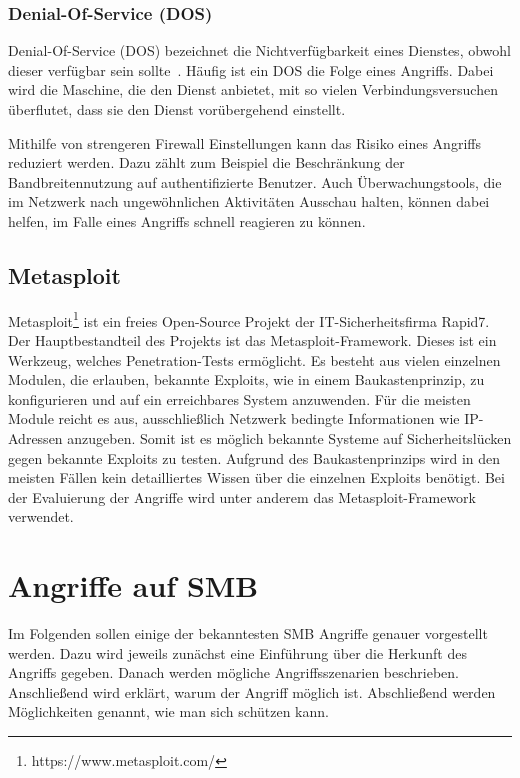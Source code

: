 \documentclass{AIFB_ITI_Crypto_Seminar}
\begin{document}
\subsubsection{Denial-Of-Service (DOS)}
Denial-Of-Service (DOS) bezeichnet die Nichtverfügbarkeit eines Dienstes, obwohl dieser verfügbar sein sollte~\cite{dos}. Häufig ist ein DOS die Folge eines Angriffs. Dabei wird die Maschine, die den Dienst anbietet, mit so vielen Verbindungsversuchen überflutet, dass sie den Dienst vorübergehend einstellt. \par
Mithilfe von strengeren Firewall Einstellungen kann das Risiko eines Angriffs reduziert werden. Dazu zählt zum Beispiel die Beschränkung der Bandbreitennutzung auf authentifizierte Benutzer. Auch Überwachungstools, die im Netzwerk nach ungewöhnlichen Aktivitäten Ausschau halten, können dabei helfen, im Falle eines Angriffs schnell reagieren zu können.

\subsection{Metasploit}
Metasploit\footnote{https://www.metasploit.com/} ist ein freies Open-Source Projekt der IT-Sicherheitsfirma Rapid7. Der Hauptbestandteil des Projekts ist das Metasploit-Framework. Dieses ist ein Werkzeug, welches Penetration-Tests ermöglicht. Es besteht aus vielen einzelnen Modulen, die erlauben, bekannte Exploits, wie in einem Baukastenprinzip, zu konfigurieren und auf ein erreichbares System anzuwenden. Für die meisten Module reicht es aus, ausschließlich Netzwerk bedingte Informationen wie IP-Adressen anzugeben. Somit ist es möglich bekannte Systeme auf Sicherheitslücken gegen bekannte Exploits zu testen. Aufgrund des Baukastenprinzips wird in den meisten Fällen kein detailliertes Wissen über die einzelnen Exploits benötigt. Bei der Evaluierung der Angriffe wird unter anderem das Metasploit-Framework verwendet.

\section{Angriffe auf SMB}
\label{sec:angriffe}
Im Folgenden sollen einige der bekanntesten SMB Angriffe genauer vorgestellt werden. Dazu wird jeweils zunächst eine Einführung über die Herkunft des Angriffs gegeben. Danach werden mögliche Angriffsszenarien beschrieben. Anschließend wird erklärt, warum der Angriff möglich ist. Abschließend werden Möglichkeiten genannt, wie man sich schützen kann.
\end{document}
